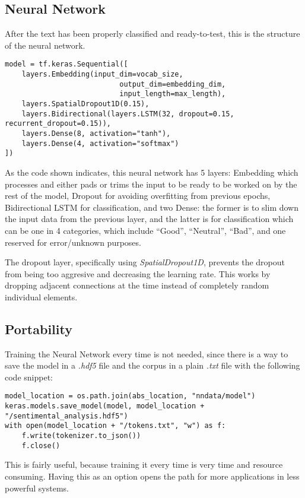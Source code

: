 \subsection{Neural Network}
After the text has been properly classified and ready-to-test, this is the structure of the neural network.
\begin{lstlisting}
model = tf.keras.Sequential([
    layers.Embedding(input_dim=vocab_size, 
                           output_dim=embedding_dim, 
                           input_length=max_length),
    layers.SpatialDropout1D(0.15),
    layers.Bidirectional(layers.LSTM(32, dropout=0.15,
recurrent_dropout=0.15)),
    layers.Dense(8, activation="tanh"),
    layers.Dense(4, activation="softmax")
])
\end{lstlisting}
As the code shown indicates, this neural network has 5 layers: Embedding which processes and either pads or trims the input to be ready to be worked on by the rest of the model, Dropout for avoiding overfitting from previous epochs, Bidirectional LSTM for classification, and two Dense: the former is to slim down the input data from the previous layer, and the latter is for classification which can be one in 4 categories, which include ``Good'', ``Neutral'', ``Bad'', and one reserved for error/unknown purposes.

The dropout layer, specifically using \textit{SpatialDropout1D}, prevents the dropout from being too aggresive and decreasing the learning rate. This works by dropping adjacent connections at the time instead of completely random individual elements.
\subsection{Portability}
Training the Neural Network every time is not needed, since there is a way to save the model in a \textit{.hdf5} file and the corpus in a plain \textit{.txt} file with the following code snippet:
\begin{lstlisting}
model_location = os.path.join(abs_location, "nndata/model")
keras.models.save_model(model, model_location + 
"/sentimental_analysis.hdf5")
with open(model_location + "/tokens.txt", "w") as f:
    f.write(tokenizer.to_json())
    f.close()
\end{lstlisting}
This is fairly useful, because training it every time is very time and resource consuming. Having this as an option opens the path for more applications in less powerful systems.
